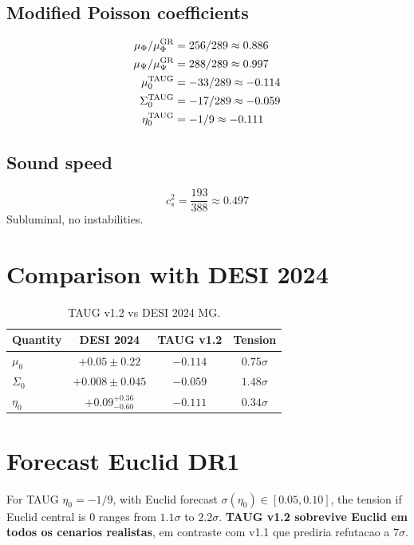 \documentclass[aps,prd,twocolumn,floatfix,nofootinbib]{revtex4-2}
\begin{document}
\subsection{Modified Poisson coefficients}
\begin{align}
\mu_\Phi/\mu_\Phi^{\rm GR} &= 256/289 \approx 0.886\\
\mu_\Psi/\mu_\Psi^{\rm GR} &= 288/289 \approx 0.997\\
\mu_0^{\rm TAUG} &= -33/289 \approx -0.114\\
\Sigma_0^{\rm TAUG} &= -17/289 \approx -0.059\\
\eta_0^{\rm TAUG} &= -1/9 \approx -0.111
\end{align}

\subsection{Sound speed}
\begin{equation}
c_s^2 = \frac{193}{388} \approx 0.497
\end{equation}
Subluminal, no instabilities.

\section{Comparison with DESI 2024}
\begin{table}[h]
\caption{TAUG v1.2 vs DESI 2024 MG.}
\begin{tabular}{lccc}
\hline\hline
Quantity & DESI 2024 & TAUG v1.2 & Tension \\
\hline
$\mu_0$    & $+0.05 \pm 0.22$    & $-0.114$ & $0.75\sigma$ \\
$\Sigma_0$ & $+0.008 \pm 0.045$  & $-0.059$ & $1.48\sigma$ \\
$\eta_0$   & $+0.09^{+0.36}_{-0.60}$ & $-0.111$ & $0.34\sigma$ \\
\hline\hline
\end{tabular}
\end{table}

\section{Forecast Euclid DR1}
For TAUG $\eta_0 = -1/9$, with Euclid forecast $\sigma(\eta_0) \in [0.05, 0.10]$,
the tension if Euclid central is $0$ ranges from $1.1\sigma$ to $2.2\sigma$.
\textbf{TAUG v1.2 sobrevive Euclid em todos os cenarios realistas}, em contraste
com v1.1 que prediria refutacao a $7\sigma$.
\end{document}
